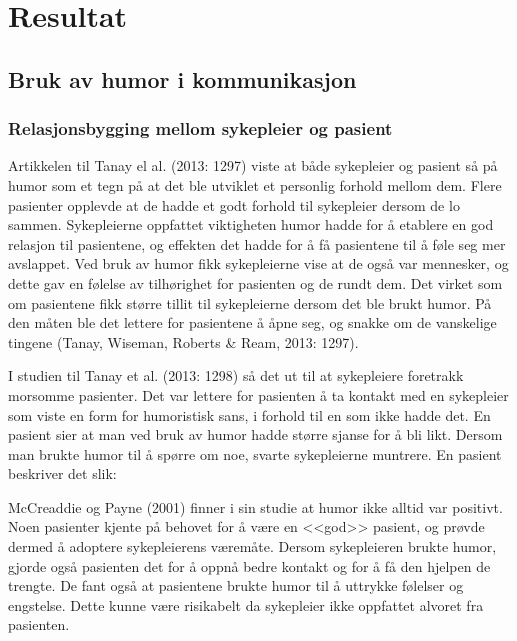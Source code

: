 \chapter{Resultat}

\section{Bruk av humor i kommunikasjon}

\subsection{Relasjonsbygging mellom sykepleier og pasient}
\label{res.relbygg}

Artikkelen til Tanay el al. (2013: 1297) viste at både sykepleier og pasient så
på humor som et tegn på at det ble utviklet et personlig forhold mellom dem.
Flere pasienter opplevde at de hadde et godt forhold til sykepleier dersom de
lo sammen. Sykepleierne oppfattet viktigheten humor hadde for å etablere en god
relasjon til pasientene, og effekten det hadde for å få pasientene til å føle
seg mer avslappet. Ved bruk av humor fikk sykepleierne vise at de også var
mennesker, og dette gav en følelse av tilhørighet for pasienten og de rundt
dem. Det virket som om pasientene fikk større tillit til sykepleierne dersom
det ble brukt humor. På den måten ble det lettere for pasientene å åpne seg, og
snakke om de vanskelige tingene (Tanay, Wiseman, Roberts \&{} Ream, 2013: 1297).

I studien til Tanay et al. (2013: 1298) så det ut til at sykepleiere foretrakk
morsomme pasienter. Det var lettere for pasienten å ta kontakt med en
sykepleier som viste en form for humoristisk sans, i forhold til en som ikke
hadde det. En pasient sier at man ved bruk av humor hadde større sjanse for å
bli likt. Dersom man brukte humor til å spørre om noe, svarte sykepleierne
muntrere. En pasient beskriver det slik: 

McCreaddie og Payne (2001) finner i sin studie at humor ikke alltid var
positivt. Noen pasienter kjente på behovet for å være en <<god>> pasient, og
prøvde dermed å adoptere sykepleierens væremåte. Dersom sykepleieren brukte
humor, gjorde også pasienten det for å oppnå bedre kontakt og for å få den
hjelpen de trengte. De fant også at pasientene brukte humor til å uttrykke
følelser og engstelse. Dette kunne være risikabelt da sykepleier ikke oppfattet
alvoret fra pasienten.

